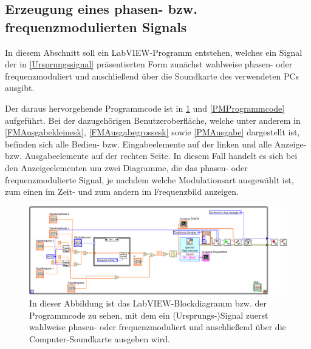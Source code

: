 \documentclass[
a4paper,
12pt,
pagesize,
ngerman
]{scrartcl}
\begin{document}
	\subsection{Erzeugung eines phasen- bzw. frequenzmodulierten Signals} \label{FMPMErzeugung}
		
	In diesem Abschnitt soll ein LabVIEW-Programm entstehen, welches ein Signal der in \cref{Ursprungssignal} präsentierten Form zunächst wahlweise phasen- oder frequenzmoduliert und anschließend über die Soundkarte des verwendeten PCs ausgibt. 
	
	Der daraus hervorgehende Programmcode ist in \cref{FMProgrammcode} und \cref{PMProgrammcode} aufgeführt. 
	Bei der dazugehörigen Benutzeroberfläche, welche unter anderem in \cref{FMAusgabekleinesk}, \cref{FMAusgabegrossesk} sowie \cref{PMAusgabe} dargestellt ist, befinden sich alle Bedien- bzw. Eingabeelemente auf der linken und alle Anzeige- bzw. Ausgabeelemente auf der rechten Seite. 
	In diesem Fall handelt es sich bei den Anzeigeelementen um zwei Diagramme, die das phasen- oder frequenzmodulierte Signal, je nachdem welche Modulationsart ausgewählt ist, zum einen im Zeit- und zum andern im Frequenzbild anzeigen. 

	\begin{figure}[H]
		\centering
		\includegraphics[width=1.0\textwidth]{EIRE2018Dateien/Tag4/FMPM-Erzeugung/FMPM-Erzeugungd}
		\caption{In dieser Abbildung ist das LabVIEW-Blockdiagramm bzw. der Programmcode zu sehen, mit dem ein (Ursprungs-)Signal zuerst wahlweise phasen- oder frequenzmoduliert und anschließend über die Computer-Soundkarte ausgeben wird.}
		\label{FMProgrammcode}
	\end{figure}
\end{document}
